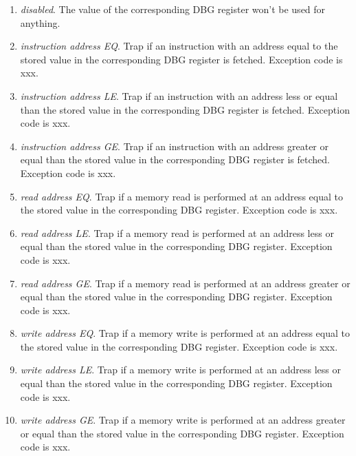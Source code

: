\documentclass{article}
\begin{document}
                \begin{enumerate}

                    \item \textit{disabled}. The value of the corresponding DBG register won't be used for anything.
                    \item \textit{instruction address EQ}. Trap if an instruction with an address equal to the stored value in the corresponding DBG register is fetched. Exception code is xxx.

                    \item \textit{instruction address LE}. Trap if an instruction with an address less or equal than the stored value in the corresponding DBG register is fetched. Exception code is xxx.

                    \item \textit{instruction address GE}. Trap if an instruction with an address greater or equal than the stored value in the corresponding DBG register is fetched. Exception code is xxx.

                    \item \textit{read address EQ}. Trap if a memory read is performed at an address equal to the stored value in the corresponding DBG register. Exception code is xxx.

                    \item \textit{read address LE}. Trap if a memory read is performed at an address less or equal than the stored value in the corresponding DBG register. Exception code is xxx.

                    \item \textit{read address GE}. Trap if a memory read is performed at an address greater or equal than the stored value in the corresponding DBG register. Exception code is xxx.

                    \item \textit{write address EQ}. Trap if a memory write is performed at an address equal to the stored value in the corresponding DBG register. Exception code is xxx.

                    \item \textit{write address LE}. Trap if a memory write is performed at an address less or equal than the stored value in the corresponding DBG register. Exception code is xxx.

                    \item \textit{write address GE}. Trap if a memory write is performed at an address greater or equal than the stored value in the corresponding DBG register. Exception code is xxx.


\end{enumerate}
\end{document}
